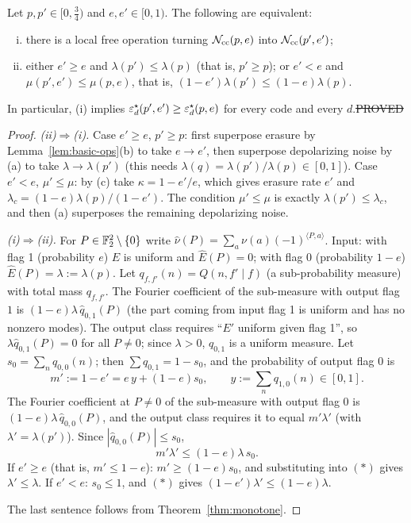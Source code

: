 \begin{theorem}\label{thm:preorder}
Let $p,p'\in[0,\tfrac34)$ and $e,e'\in[0,1)$. The following are equivalent:
\begin{enumerate}[(i)]
\item there is a local free operation turning $\mathcal{N}_{\rm cc}(p,e)$ into $\mathcal{N}_{\rm cc}(p',e')$;
\item either $e'\ge e$ and $\lambda(p')\le\lambda(p)$ (that is, $p'\ge p$); or $e'<e$ and $\mu(p',e')\le\mu(p,e)$,
that is, $(1-e')\lambda(p')\le(1-e)\lambda(p)$.
\end{enumerate}
In particular, (i) implies $\varepsilon^{\star}_d(p',e')\ge\varepsilon^{\star}_d(p,e)$ for every code and every $d$.\hfill\st{PROVED}
\end{theorem}
\begin{proof}
\emph{(ii)$\Rightarrow$(i).} Case $e'\ge e$, $p'\ge p$: first superpose erasure by Lemma~\ref{lem:basic-ops}(b) to take $e\to e'$,
then superpose depolarizing noise by (a) to take $\lambda\to\lambda(p')$ (this needs $\lambda(q)=\lambda(p')/\lambda(p)\in[0,1]$).
Case $e'<e$, $\mu'\le\mu$: by (c) take $\kappa=1-e'/e$, which gives erasure rate $e'$ and
$\lambda_c=(1-e)\lambda(p)/(1-e')$. The condition $\mu'\le\mu$ is exactly $\lambda(p')\le\lambda_c$, and then (a) superposes the remaining depolarizing noise.

\emph{(i)$\Rightarrow$(ii).} For $P\in\mathbb{F}_2^2\setminus\{0\}$ write $\hat\nu(P)=\sum_a\nu(a)(-1)^{\langle P,a\rangle}$.
Input: with flag 1 (probability $e$) $E$ is uniform and $\hat E(P)=0$; with flag 0 (probability $1-e$) $\hat E(P)=\lambda:=\lambda(p)$.
Let $q_{f,f'}(n)=Q(n,f'\mid f)$ (a sub-probability measure) with total mass $q_{f,f'}$. The Fourier coefficient of the sub-measure with output flag $1$ is
$(1-e)\lambda\,\hat q_{0,1}(P)$ (the part coming from input flag 1 is uniform and has no nonzero modes).
The output class requires ``$E'$ uniform given flag 1'', so $\lambda\hat q_{0,1}(P)=0$ for all $P\ne0$; since $\lambda>0$, $q_{0,1}$ is a uniform measure.
Let $s_0=\sum_n q_{0,0}(n)$; then $\sum q_{0,1}=1-s_0$, and the probability of output flag $0$ is
\[
m':=1-e'=e\,y+(1-e)s_0,\qquad y:=\textstyle\sum_nq_{1,0}(n)\in[0,1].
\]
The Fourier coefficient at $P\neq0$ of the sub-measure with output flag 0 is $(1-e)\lambda\,\hat q_{0,0}(P)$, and the output class requires it to equal
$m'\lambda'$ (with $\lambda'=\lambda(p')$). Since $|\hat q_{0,0}(P)|\le s_0$,
\[
m'\lambda'\le(1-e)\lambda\,s_0.\tag{$*$}
\]
If $e'\ge e$ (that is, $m'\le1-e$): $m'\ge(1-e)s_0$, and substituting into $(*)$ gives $\lambda'\le\lambda$.
If $e'<e$: $s_0\le1$, and $(*)$ gives $(1-e')\lambda'\le(1-e)\lambda$.

The last sentence follows from Theorem~\ref{thm:monotone}.
\end{proof}

